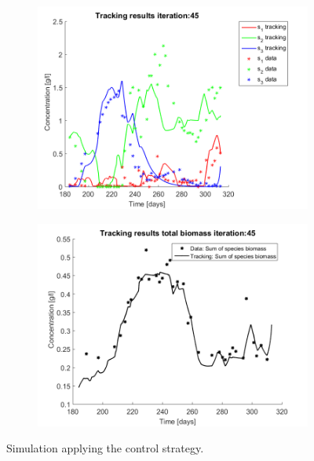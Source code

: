 \documentclass[3p,times]{elsarticle}
\begin{document}
\begin{figure}[h]
	\centering
	\begin{subfigure}{0.45 \textwidth}
		\includegraphics[width=\textwidth]{Application//191218_Reactor_A_metabolites_Iter_45}
	\end{subfigure}
	\begin{subfigure}{0.45 \textwidth}
		\includegraphics[width=\textwidth]{Application//191218_Reactor_A_Biomass_Iter_45}
	\end{subfigure}
	\caption{Simulation applying the control strategy.}
	\label{ControlSimulation}
\end{figure}
\end{document}
